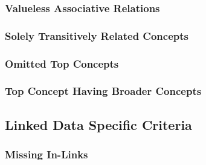 

\subsubsection{Valueless Associative Relations}


\subsubsection{Solely Transitively Related Concepts}


\subsubsection{Omitted Top Concepts}


\subsubsection{Top Concept Having Broader Concepts}



\subsection{Linked Data Specific Criteria}

\subsubsection{Missing In-Links}

